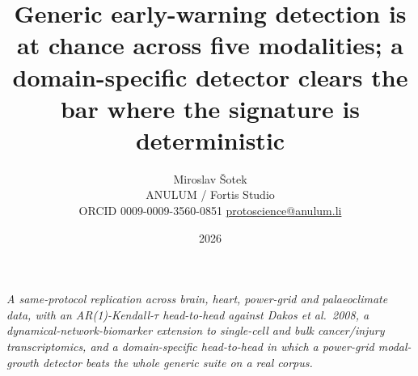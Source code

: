 \documentclass[11pt]{article}
\title{Generic early-warning detection is at chance across five modalities;
a domain-specific detector clears the bar where the signature is
deterministic}
\author{Miroslav \v{S}otek\\
  ANULUM / Fortis Studio\\
  ORCID 0009-0009-3560-0851 \quad \href{mailto:protoscience@anulum.li}{protoscience@anulum.li}}
\date{2026}
\begin{document}
\maketitle

\begin{center}
\begin{minipage}{0.92\textwidth}
\itshape
A same-protocol replication across brain, heart, power-grid and
palaeoclimate data, with an AR(1)-Kendall-$\tau$ head-to-head against
Dakos et al.\ 2008, a dynamical-network-biomarker extension to
single-cell and bulk cancer/injury transcriptomics, and a
domain-specific head-to-head in which a power-grid modal-growth detector
beats the whole generic suite on a real corpus.
\end{minipage}
\end{center}
\end{document}
